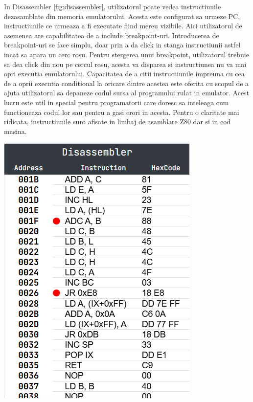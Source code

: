 \documentclass[titlepage,12pt]{article}
\begin{document}
\begin{minipage}{0.55\textwidth} %
    In Disassembler \cref{fig:disassembler}, utilizatorul poate vedea instructiunile dezasamblate din memoria emulatorului. Acesta este configurat sa urmeze PC, instructiunile ce urmeaza a fi executate fiind mereu vizibile. Aici utilizatorul de asemenea are capabilitatea de a include breakpoint-uri. Introducerea de breakpoint-uri se face simplu, doar prin a da click in stanga instructiunii astfel incat sa apara un cerc rosu. Pentru stergerea unui breakpoint, utilizatorul trebuie sa dea click din nou pe cercul rosu, acesta va disparea si instructiunea nu va mai opri executia emulatorului. Capacitatea de a citii instructiunile impreuna cu cea de a oprii executia conditional la oricare dintre acestea este oferita cu scopul de a ajuta utilizatorul sa depaneze codul sursa al programului rulat in emulator. Acest lucru este util in special pentru programatorii care doresc sa inteleaga cum functioneaza codul lor sau pentru a gasi erori in acesta. Pentru o claritate mai ridicata, instructiunile sunt afisate in limbaj de asamblare Z80 dar si in cod masina.
\end{minipage}%
\hfill
\begin{minipage}{0.4\textwidth} %
    \centering
    \includegraphics[width=\linewidth]{images/disassembler.png}
    \label{fig:disassembler}
\end{minipage}
\end{document}
